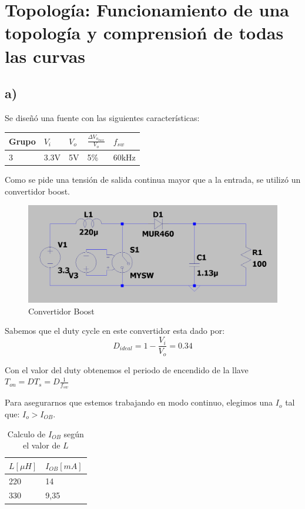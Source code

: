\documentclass[e4_tp1_main.tex]{subfiles}
\begin{document}
\section{Topolog\'ia: Funcionamiento de una topolog\'ia y comprensio\'n de todas las curvas}

\subsection*{a)} 

Se diseñ\'o una fuente con las siguientes caracter\'isticas:

\begin{table}[H]
\centering
\begin{tabular}{|l|l|l|l|l|}
\hline
\multicolumn{1}{|c|}{Grupo}  & $V_{i}$ & $V_{o}$  & $\frac{\Delta V_{o_{max}}}{V_o}$ & $f_{sw}$ \\ \hline
3     						& 3.3V     & 5V  & 5\%   & 60kHz  \\ \hline
\end{tabular}
\label{tabla:datos de la fuente}
\end{table} 

Como se pide una tensi\'on de salida continua mayor que a la entrada, se utiliz\'o un convertidor boost. 

\begin{figure}[H]
  \centering
    \includegraphics[scale = 0.5]{Imagenes/punto2/Circuito}
  \caption{Convertidor Boost}
  \label{fig:circuito pto 2}
\end{figure}

Sabemos que el duty cycle en este convertidor esta dado por: 
$$D_{ideal}=1-\frac{V_i}{V_o}=0.34$$

Con el valor del duty obtenemos el periodo de encendido de la llave $T_{on}=D T_s=D \frac{1}{f_{sw}}$


Para asegurarnos que estemos trabajando en modo continuo, elegimos una $I_{o}$ tal que: $I_{o}>I_{OB}$.

\begin{table}[H]
\centering
\begin{tabular}{|l|l|}
\hline
\multicolumn{1}{|c|}{$L [\mu H]$} & {$I_{OB} [mA]$}    \\ \hline
220                   & 14   \\ \hline
330                   & 9,35 \\ \hline
\end{tabular}
\caption{Calculo de $I_{OB}$ seg\'un el valor de $L$}
\label{tabla:calculo de Iob}
\end{table}
\end{document}
